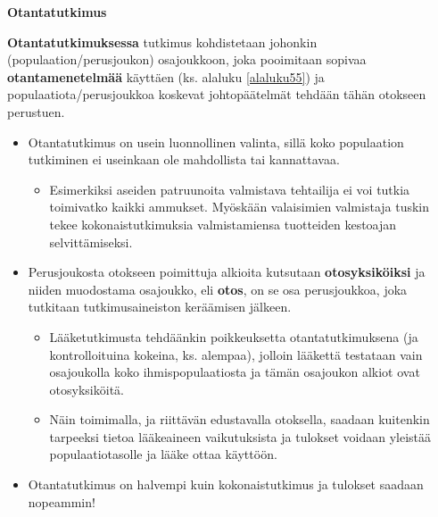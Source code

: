\documentclass[
]{book}
\providecommand{\tightlist}{%
  \setlength{\itemsep}{0pt}\setlength{\parskip}{0pt}}
\begin{document}
\begin{defblock}{}

\textbf{Otantatutkimus}

\textbf{Otantatutkimuksessa} tutkimus kohdistetaan johonkin (populaation/perusjoukon) osajoukkoon, joka pooimitaan sopivaa \textbf{otantamenetelmää} käyttäen (ks. alaluku \ref{alaluku55}) ja populaatiota/perusjoukkoa koskevat johtopäätelmät tehdään tähän otokseen perustuen.

\begin{itemize}
\tightlist
\item
  Otantatutkimus on usein luonnollinen valinta, sillä koko populaation tutkiminen ei useinkaan ole mahdollista tai kannattavaa.

  \begin{itemize}
  \tightlist
  \item
    Esimerkiksi aseiden patruunoita valmistava tehtailija ei voi tutkia toimivatko kaikki ammukset. Myöskään valaisimien valmistaja tuskin tekee kokonaistutkimuksia valmistamiensa tuotteiden kestoajan selvittämiseksi.\\
  \end{itemize}
\item
  Perusjoukosta otokseen poimittuja alkioita kutsutaan \textbf{otosyksiköiksi} ja niiden muodostama osajoukko, eli \textbf{otos}, on se osa perusjoukkoa, joka tutkitaan tutkimusaineiston keräämisen jälkeen.

  \begin{itemize}
  \tightlist
  \item
    Lääketutkimusta tehdäänkin poikkeuksetta otantatutkimuksena (ja kontrolloituina kokeina, ks. alempaa), jolloin lääkettä testataan vain osajoukolla koko ihmispopulaatiosta ja tämän osajoukon alkiot ovat otosyksiköitä.
  \item
    Näin toimimalla, ja riittävän edustavalla otoksella, saadaan kuitenkin tarpeeksi tietoa lääkeaineen vaikutuksista ja tulokset voidaan yleistää populaatiotasolle ja lääke ottaa käyttöön.
  \end{itemize}
\item
  Otantatutkimus on halvempi kuin kokonaistutkimus ja tulokset saadaan nopeammin!
\end{itemize}

\end{defblock}

\hfill\break
\end{document}
